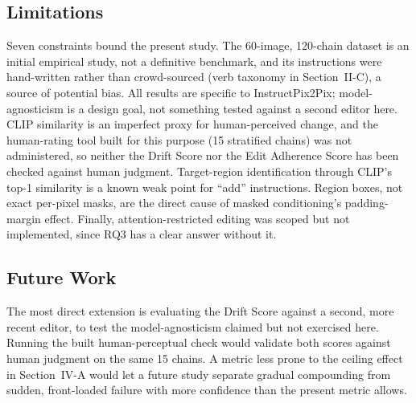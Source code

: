 \subsection{Limitations}
Seven constraints bound the present study. The 60-image, 120-chain dataset is an initial empirical study, not a definitive benchmark, and its instructions were hand-written rather than crowd-sourced (verb taxonomy in Section~II-C), a source of potential bias. All results are specific to InstructPix2Pix; model-agnosticism is a design goal, not something tested against a second editor here. CLIP similarity is an imperfect proxy for human-perceived change, and the human-rating tool built for this purpose (15 stratified chains) was not administered, so neither the Drift Score nor the Edit Adherence Score has been checked against human judgment. Target-region identification through CLIP's top-1 similarity is a known weak point for ``add'' instructions. Region boxes, not exact per-pixel masks, are the direct cause of masked conditioning's padding-margin effect. Finally, attention-restricted editing was scoped but not implemented, since RQ3 has a clear answer without it.

\subsection{Future Work}
The most direct extension is evaluating the Drift Score against a second, more recent editor, to test the model-agnosticism claimed but not exercised here. Running the built human-perceptual check would validate both scores against human judgment on the same 15 chains. A metric less prone to the ceiling effect in Section~IV-A would let a future study separate gradual compounding from sudden, front-loaded failure with more confidence than the present metric allows.
